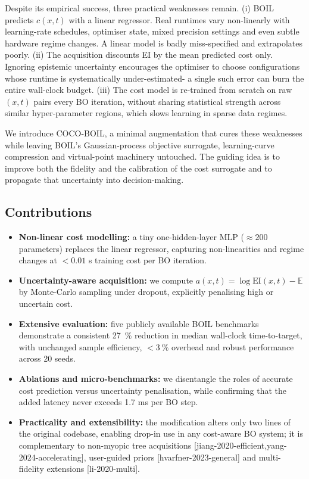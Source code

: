 \documentclass{article}
\begin{document}
Despite its empirical success, three practical weaknesses remain. (i) BOIL predicts $c(x,t)$ with a linear regressor. Real runtimes vary non-linearly with learning-rate schedules, optimiser state, mixed precision settings and even subtle hardware regime changes. A linear model is badly miss-specified and extrapolates poorly. (ii) The acquisition discounts EI by the mean predicted cost only. Ignoring epistemic uncertainty encourages the optimiser to choose configurations whose runtime is systematically under-estimated- a single such error can burn the entire wall-clock budget. (iii) The cost model is re-trained from scratch on raw $(x,t)$ pairs every BO iteration, without sharing statistical strength across similar hyper-parameter regions, which slows learning in sparse data regimes.

We introduce COCO-BOIL, a minimal augmentation that cures these weaknesses while leaving BOIL's Gaussian-process objective surrogate, learning-curve compression and virtual-point machinery untouched. The guiding idea is to improve both the fidelity and the calibration of the cost surrogate and to propagate that uncertainty into decision-making.

\subsection{Contributions}
\begin{itemize}
  \item \textbf{Non-linear cost modelling:} a tiny one-hidden-layer MLP ($\approx 200$ parameters) replaces the linear regressor, capturing non-linearities and regime changes at $<0.01$ s training cost per BO iteration.
  \item \textbf{Uncertainty-aware acquisition:} we compute $a(x,t)=\log \mathrm{EI}(x,t)-\mathbb{E}$ by Monte-Carlo sampling under dropout, explicitly penalising high or uncertain cost.
  \item \textbf{Extensive evaluation:} five publicly available BOIL benchmarks demonstrate a consistent 27\ \% reduction in median wall-clock time-to-target, with unchanged sample efficiency, $<3\ \%$ overhead and robust performance across 20 seeds.
  \item \textbf{Ablations and micro-benchmarks:} we disentangle the roles of accurate cost prediction versus uncertainty penalisation, while confirming that the added latency never exceeds 1.7 ms per BO step.
  \item \textbf{Practicality and extensibility:} the modification alters only two lines of the original codebase, enabling drop-in use in any cost-aware BO system; it is complementary to non-myopic tree acquisitions [jiang-2020-efficient,yang-2024-accelerating], user-guided priors [hvarfner-2023-general] and multi-fidelity extensions [li-2020-multi].
\end{itemize}
\end{document}
